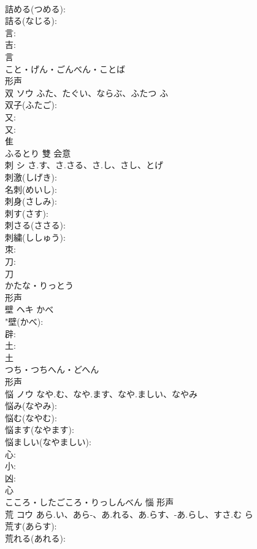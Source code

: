 \documentclass[8pt]{extreport}
\begin{document}
\begin{CJK}{UTF8}{min}
\\	詰める(つめる): 
\\	詰る(なじる): 
\\	言: 
\\	吉: 
\\	言	
\\	こと・げん・ごんべん・ことば	
\\	形声 
\\	双	ソウ	ふた、たぐい、ならぶ、ふたつ	ふ	
\\	双子(ふたご): 
\\	又: 
\\	又: 
\\	隹	
\\	ふるとり	雙	会意 
\\	刺	シ	さ.す、さ.さる、さ.し、さし、とげ		
\\	刺激(しげき): 
\\	名刺(めいし): 
\\	刺身(さしみ): 
\\	刺す(さす): 
\\	刺さる(ささる): 
\\	刺繍(ししゅう): 
\\	朿: 
\\	刀: 
\\	刀	
\\	かたな・りっとう	
\\	形声 
\\	壁	ヘキ	かべ		
\\	"壁(かべ): 
\\	辟: 
\\	土: 
\\	土	
\\	つち・つちへん・どへん	
\\	形声 
\\	悩	ノウ	なや.む、なや.ます、なや.ましい、なやみ		
\\	悩み(なやみ): 
\\	悩む(なやむ): 
\\	悩ます(なやます): 
\\	悩ましい(なやましい): 
\\	心: 
\\	小: 
\\	凶: 
\\	心	
\\	こころ・したごころ・りっしんべん	惱	形声 
\\	荒	コウ	あら.い、あら-、あ.れる、あ.らす、-あ.らし、すさ.む	ら	
\\	荒す(あらす): 
\\	荒れる(あれる): 

\end{CJK}
\end{document}
